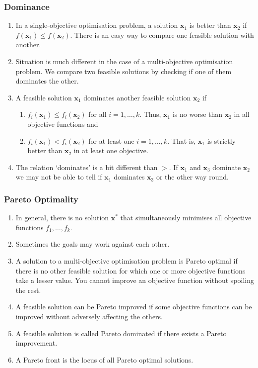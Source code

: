 \documentclass{beamer}
\begin{document}
\begin{frame}
\frametitle{Dominance}
\begin{enumerate}
\item In a single-objective optimisation problem, a solution $\bm{x}_1$ is 
better than $\bm{x}_2$ if $f(\bm{x}_1) \le f(\bm{x}_2)$. There is an easy way 
to compare one feasible solution with another.
\item Situation is much different in the case of a multi-objective optimisation
problem. We compare two feasible solutions by checking if one of them dominates
the other.
\item A feasible solution $\bm{x}_1$ dominates another feasible solution 
$\bm{x}_2$ if
\begin{enumerate}
\item $f_i(\bm{x}_1) \le f_i(\bm{x}_2)$ for all $i = 1, \ldots, k$. Thus, 
$\bm{x}_1$ is no worse than $\bm{x}_2$ in all objective functions and
\item $f_i(\bm{x}_1) < f_i(\bm{x}_2)$ for at least one $i = 1, \ldots, k$.
That is, $\bm{x}_1$ is strictly better than $\bm{x}_2$ in at least one 
objective.
\end{enumerate}
\item The relation `dominates' is a bit different than $>$. If $\bm{x}_1$ and
$\bm{x}_3$ dominate $\bm{x}_2$ we may not be able to tell if $\bm{x}_1$ 
dominates $\bm{x}_3$ or the other way round.
\end{enumerate}
\end{frame}

\begin{frame}
\frametitle{Pareto Optimality}
\begin{enumerate}
\item In general, there is no solution $\bm{x}^\ast$ that simultaneously 
minimises all objective functions $f_1, \ldots, f_k$.
\item Sometimes the goals may work against each other.
\item A solution to a multi-objective optimisation problem is Pareto optimal if
there is no other feasible solution for which one or more objective functions 
take a lesser value. You cannot improve an objective function without spoiling 
the rest.
\item A feasible solution can be Pareto improved if some objective functions can
be improved without adversely affecting the others.
\item A feasible solution is called Pareto dominated if there exists a Pareto
improvement.
\item A Pareto front is the locus of all Pareto optimal solutions.
\end{enumerate}
\end{frame}
\end{document}

